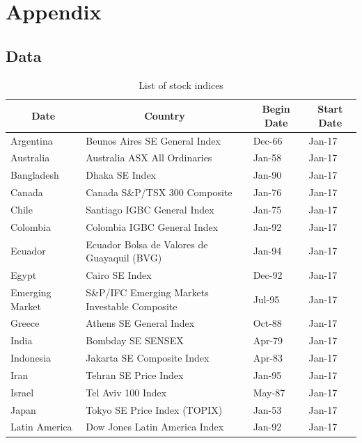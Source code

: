 \documentclass[12pt,final,fleqn]{article}
\theoremstyle{plain}
\begin{document}
\section{Appendix} \label{sec: appendix}

\subsection{Data} \label{subsec: data}

\begin{table}[H]
\caption{List of stock indices} \label{tab:stock-list}
\vspace{-5pt}
\scriptsize
\begin{center}
\begin{threeparttable}
\begin{tabular*}{\textwidth}{l@{\extracolsep{\fill}}lll}
  \hline
  \hline
  \multicolumn{1}{c}{Date}&\multicolumn{1}{c}{Country}&\multicolumn{1}{c}{Begin Date} &\multicolumn{1}{c}{Start Date}\\
  \hline
Argentina & Beunos Aires SE General Index & Dec-66 & Jan-17\\
Australia & Australia ASX All Ordinaries & Jan-58 & Jan-17\\
Bangladesh & Dhaka SE Index & Jan-90 & Jan-17\\
Canada & Canada S\&P/TSX 300 Composite & Jan-76 & Jan-17\\
Chile & Santiago IGBC General Index & Jan-75 & Jan-17\\
Colombia & Colombia IGBC General Index & Jan-92 & Jan-17\\
Ecuador & Ecuador Bolsa de Valores de Guayaquil (BVG) & Jan-94 & Jan-17\\
Egypt & Cairo SE Index & Dec-92 & Jan-17\\
Emerging Market & S\&P/IFC Emerging Markets Investable Composite & Jul-95 & Jan-17\\
Greece & Athens SE General Index & Oct-88 & Jan-17\\
India & Bombday SE SENSEX & Apr-79 & Jan-17\\
Indonesia & Jakarta SE Composite Index & Apr-83 & Jan-17\\
Iran & Tehran SE Price Index & Jan-95 & Jan-17\\
Israel & Tel Aviv 100 Index & May-87 & Jan-17\\
Japan & Tokyo SE Price Index (TOPIX) & Jan-53 & Jan-17\\
Latin America & Dow Jones Latin America Index & Jan-92 & Jan-17\\

\end{tabular*}
\end{threeparttable}
\end{center}
\end{table}
\end{document}

